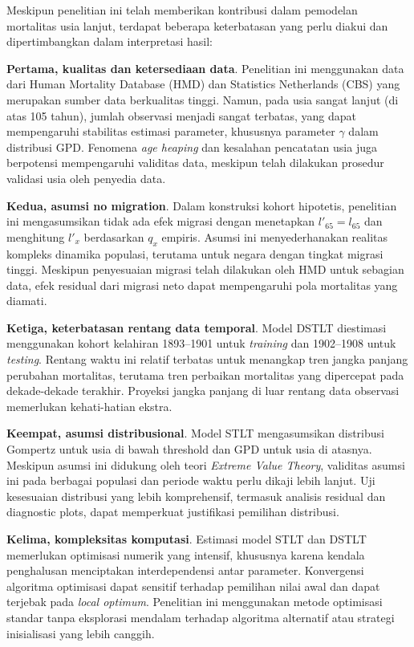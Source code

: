 Meskipun penelitian ini telah memberikan kontribusi dalam pemodelan mortalitas usia lanjut, terdapat beberapa keterbatasan yang perlu diakui dan dipertimbangkan dalam interpretasi hasil:

\textbf{Pertama, kualitas dan ketersediaan data}. Penelitian ini menggunakan data dari Human Mortality Database (HMD) dan Statistics Netherlands (CBS) yang merupakan sumber data berkualitas tinggi. Namun, pada usia sangat lanjut (di atas 105 tahun), jumlah observasi menjadi sangat terbatas, yang dapat mempengaruhi stabilitas estimasi parameter, khususnya parameter $\gamma$ dalam distribusi GPD. Fenomena \textit{age heaping} dan kesalahan pencatatan usia juga berpotensi mempengaruhi validitas data, meskipun telah dilakukan prosedur validasi usia oleh penyedia data.

\textbf{Kedua, asumsi no migration}. Dalam konstruksi kohort hipotetis, penelitian ini mengasumsikan tidak ada efek migrasi dengan menetapkan $l'_{65} = l_{65}$ dan menghitung $l'_x$ berdasarkan $q_x$ empiris. Asumsi ini menyederhanakan realitas kompleks dinamika populasi, terutama untuk negara dengan tingkat migrasi tinggi. Meskipun penyesuaian migrasi telah dilakukan oleh HMD untuk sebagian data, efek residual dari migrasi neto dapat mempengaruhi pola mortalitas yang diamati.

\textbf{Ketiga, keterbatasan rentang data temporal}. Model DSTLT diestimasi menggunakan kohort kelahiran 1893--1901 untuk \textit{training} dan 1902--1908 untuk \textit{testing}. Rentang waktu ini relatif terbatas untuk menangkap tren jangka panjang perubahan mortalitas, terutama tren perbaikan mortalitas yang dipercepat pada dekade-dekade terakhir. Proyeksi jangka panjang di luar rentang data observasi memerlukan kehati-hatian ekstra.

\textbf{Keempat, asumsi distribusional}. Model STLT mengasumsikan distribusi Gompertz untuk usia di bawah threshold dan GPD untuk usia di atasnya. Meskipun asumsi ini didukung oleh teori \textit{Extreme Value Theory}, validitas asumsi ini pada berbagai populasi dan periode waktu perlu dikaji lebih lanjut. Uji kesesuaian distribusi yang lebih komprehensif, termasuk analisis residual dan diagnostic plots, dapat memperkuat justifikasi pemilihan distribusi.

\textbf{Kelima, kompleksitas komputasi}. Estimasi model STLT dan DSTLT memerlukan optimisasi numerik yang intensif, khususnya karena kendala penghalusan menciptakan interdependensi antar parameter. Konvergensi algoritma optimisasi dapat sensitif terhadap pemilihan nilai awal dan dapat terjebak pada \textit{local optimum}. Penelitian ini menggunakan metode optimisasi standar tanpa eksplorasi mendalam terhadap algoritma alternatif atau strategi inisialisasi yang lebih canggih.

